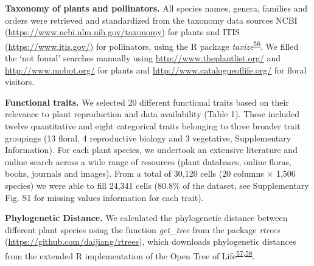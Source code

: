 \documentclass[12pt,a4paper,]{article}
\begin{document}
\textbf{Taxonomy of plants and pollinators.} All species names, genera,
families and orders were retrieved and standardized from the taxonomy
data sources NCBI (\url{https://www.ncbi.nlm.nih.gov/taxonomy}) for
plants and ITIS (\url{https://www.itis.gov/}) for pollinators, using the
R package
\emph{taxize}\textsuperscript{\protect\hyperlink{ref-chamberlain2020}{56}}.
We filled the `not found' searches manually using
\url{http://www.theplantlist.org/} and \url{http://www.mobot.org/} for
plants and \url{http://www.catalogueoflife.org/} for floral visitors.

\textbf{Functional traits.} We selected 20 different functional traits
based on their relevance to plant reproduction and data availability
(Table 1). These included twelve quantitative and eight categorical
traits belonging to three broader trait groupings (13 floral, 4
reproductive biology and 3 vegetative, Supplementary Information). For
each plant species, we undertook an extensive literature and online
search across a wide range of resources (plant databases, online floras,
books, journals and images). From a total of 30,120 cells (20 columns ×
1,506 species) we were able to fill 24,341 cells (80.8\% of the dataset,
see Supplementary Fig. S1 for missing values information for each
trait).

\textbf{Phylogenetic Distance.} We calculated the phylogenetic distance
between different plant species using the function \emph{get\_tree} from
the package \emph{rtrees} (\url{https://github.com/daijiang/rtrees}),
which downloads phylogenetic distances from the extended R
implementation of the Open Tree of
Life\textsuperscript{\protect\hyperlink{ref-smith2018}{57},\protect\hyperlink{ref-jin2019}{58}}.

\singlespacing
\end{document}
